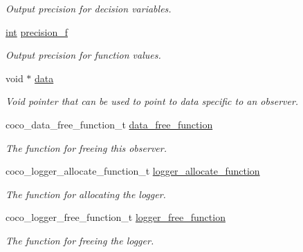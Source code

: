 \begin{DoxyCompactItemize}
\begin{DoxyCompactList}\small\item\em Output precision for decision variables. \end{DoxyCompactList}\item 
\hyperlink{classint}{int} \hyperlink{structcoco__observer__s_aef495e1b258763becca0f0c04891794d}{precision\+\_\+f}\hypertarget{structcoco__observer__s_aef495e1b258763becca0f0c04891794d}{}\label{structcoco__observer__s_aef495e1b258763becca0f0c04891794d}

\begin{DoxyCompactList}\small\item\em Output precision for function values. \end{DoxyCompactList}\item 
void $\ast$ \hyperlink{structcoco__observer__s_abfde98722c29946c6f72bc829e40d40c}{data}\hypertarget{structcoco__observer__s_abfde98722c29946c6f72bc829e40d40c}{}\label{structcoco__observer__s_abfde98722c29946c6f72bc829e40d40c}

\begin{DoxyCompactList}\small\item\em Void pointer that can be used to point to data specific to an observer. \end{DoxyCompactList}\item 
coco\+\_\+data\+\_\+free\+\_\+function\+\_\+t \hyperlink{structcoco__observer__s_ad33683a6c8fe06a63e0e88ce8daa28f0}{data\+\_\+free\+\_\+function}\hypertarget{structcoco__observer__s_ad33683a6c8fe06a63e0e88ce8daa28f0}{}\label{structcoco__observer__s_ad33683a6c8fe06a63e0e88ce8daa28f0}

\begin{DoxyCompactList}\small\item\em The function for freeing this observer. \end{DoxyCompactList}\item 
coco\+\_\+logger\+\_\+allocate\+\_\+function\+\_\+t \hyperlink{structcoco__observer__s_a86157bafa769bddfd0fbb5e75aaf7097}{logger\+\_\+allocate\+\_\+function}\hypertarget{structcoco__observer__s_a86157bafa769bddfd0fbb5e75aaf7097}{}\label{structcoco__observer__s_a86157bafa769bddfd0fbb5e75aaf7097}

\begin{DoxyCompactList}\small\item\em The function for allocating the logger. \end{DoxyCompactList}\item 
coco\+\_\+logger\+\_\+free\+\_\+function\+\_\+t \hyperlink{structcoco__observer__s_a764bfd52c19283162f4975d5acc23c89}{logger\+\_\+free\+\_\+function}\hypertarget{structcoco__observer__s_a764bfd52c19283162f4975d5acc23c89}{}\label{structcoco__observer__s_a764bfd52c19283162f4975d5acc23c89}

\begin{DoxyCompactList}\small\item\em The function for freeing the logger. \end{DoxyCompactList}\end{DoxyCompactItemize}


